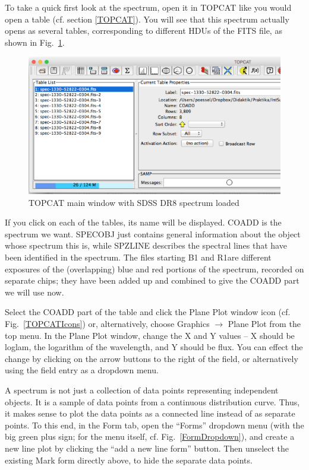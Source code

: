 \documentclass[twocolumn,apj]{openjournal}
\begin{document}
To take a quick first look at the spectrum, open it in TOPCAT like you would open a table (cf. section \ref{TOPCAT}). You will see that this spectrum actually opens as several tables, corresponding to different HDUs of the FITS file, as shown in Fig.~\ref{SpectrumLoaded}.
\begin{figure}[htbp]
\begin{center}
\includegraphics[width=\linewidth]{topcat-spectra.png}
\caption{TOPCAT main window with SDSS DR8 spectrum loaded}
\label{SpectrumLoaded}
\end{center}
\end{figure}
If you click on each of the tables, its name will be displayed. COADD is the spectrum we want. SPECOBJ just contains general information about the object whose spectrum this is, while SPZLINE describes the spectral lines that have been identified in the spectrum. The files starting B1 and R1are different exposures of the (overlapping) blue and red portions of the spectrum, recorded on separate chips; they have been added up and combined to give the COADD part we will use now.

Select the COADD part of the table and click the Plane Plot window icon (cf. Fig.~\ref{TOPCATIcons}) or, alternatively, choose Graphics $\to$ Plane Plot from the top menu. In the Plane Plot window, change the X and Y values -- X should be loglam, the logarithm of the wavelength, and Y should be flux. You can effect the change by clicking on the arrow buttons to the right of the field, or alternatively using the field entry as a dropdown menu. 

A spectrum is not just a collection of data points representing independent objects. It is a sample of data points from a continuous distribution curve. Thus, it makes sense to plot the data points as a connected line instead of as separate points. To this end, in the Form tab, open the ``Forms'' dropdown menu (with the big green plus sign; for the menu itself, cf. Fig.~\ref{FormDropdown}), and  create a new line plot by clicking the ``add a new line form'' button. Then unselect the existing Mark form directly above, to hide the separate data points.
\end{document}
